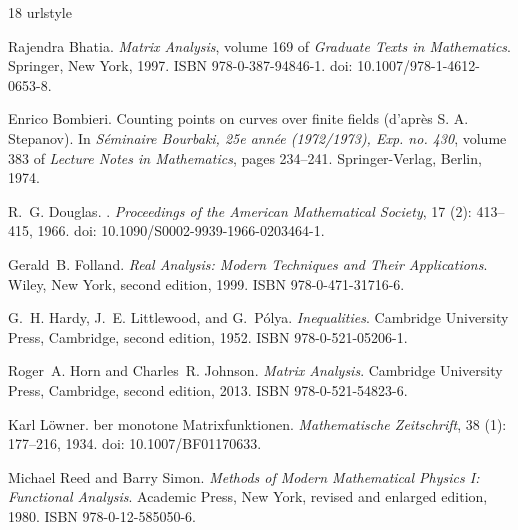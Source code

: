 \documentclass[11pt]{article}
\theoremstyle{definition}
\begin{document}
\clearpage

\begin{thebibliography}{18}
\providecommand{\natexlab}[1]{#1}
\providecommand{\url}[1]{\texttt{#1}}
\expandafter\ifx\csname urlstyle\endcsname\relax
  \providecommand{\doi}[1]{doi: #1}\else
  \providecommand{\doi}{doi: \begingroup \urlstyle{rm}\Url}\fi

Rajendra Bhatia.
\newblock \emph{Matrix Analysis}, volume 169 of \emph{Graduate Texts in Mathematics}.
\newblock Springer, New York, 1997.
\newblock ISBN 978-0-387-94846-1.
\newblock \doi{10.1007/978-1-4612-0653-8}.

Enrico Bombieri.
\newblock Counting points on curves over finite fields (d'apr{\`e}s {S}. {A}. {Stepanov}).
\newblock In \emph{S{\'e}minaire Bourbaki, 25e ann{\'e}e (1972/1973), Exp. no. 430}, volume 383 of \emph{Lecture Notes in Mathematics}, pages 234--241. Springer-Verlag, Berlin, 1974.

R.~G. Douglas.
.
\newblock \emph{Proceedings of the American Mathematical Society}, 17 (2): 413--415, 1966.
\newblock \doi{10.1090/S0002-9939-1966-0203464-1}.

Gerald~B. Folland.
\newblock \emph{Real Analysis: Modern Techniques and Their Applications}.
\newblock Wiley, New York, second edition, 1999.
\newblock ISBN 978-0-471-31716-6.

G.~H. Hardy, J.~E. Littlewood, and G.~P{\'o}lya.
\newblock \emph{Inequalities}.
\newblock Cambridge University Press, Cambridge, second edition, 1952.
\newblock ISBN 978-0-521-05206-1.

Roger~A. Horn and Charles~R. Johnson.
\newblock \emph{Matrix Analysis}.
\newblock Cambridge University Press, Cambridge, second edition, 2013.
\newblock ISBN 978-0-521-54823-6.

Karl L{\"o}wner.
ber monotone {M}atrixfunktionen.
\newblock \emph{Mathematische Zeitschrift}, 38 (1): 177--216, 1934.
\newblock \doi{10.1007/BF01170633}.

Michael Reed and Barry Simon.
\newblock \emph{Methods of Modern Mathematical Physics {I}: Functional Analysis}.
\newblock Academic Press, New York, revised and enlarged edition, 1980.
\newblock ISBN 978-0-12-585050-6.


\end{thebibliography}
\end{document}
